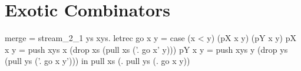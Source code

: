 \appendix
\section{Exotic Combinators}
\label{s:Combinators:Exotic}

\begin{code}
merge = stream_2_1 \xs ys xys.
  letrec
    go x y = case (x < y)
             (pX x y)
             (pY x y)
    pX x y = push xys x
            (drop xs
            (pull xs (\x'. go x' y)))
    pY x y = push xys y
            (drop ys
            (pull ys (\y'. go x y')))
  in pull xs (\x. pull ys (\y. go x y))
\end{code}


